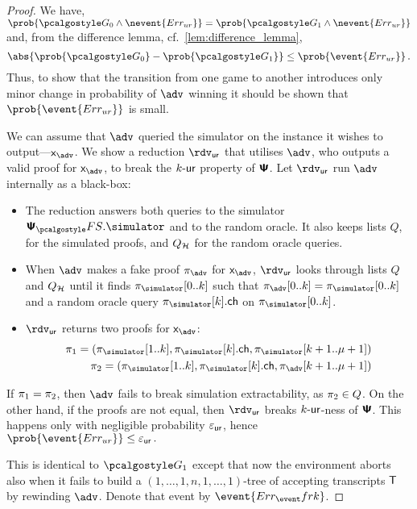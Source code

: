 \documentclass[runningheads,11pt]{llncs}
\begin{document}
\begin{proof}
   We have, \( \prob{\game{0} \land
    \nevent{\errur}} = \prob{\game{1} \land \nevent{\errur}} \) and, from the
  difference lemma, cf.~\cref{lem:difference_lemma},
  \[ \abs{\prob{\game{0}} - \prob{\game{1}}} \leq \prob{\event{\errur}}\,. \]
  Thus, to show that the transition from one game to another introduces only
  minor change in probability of $\advse$ winning it should be shown that
  $\prob{\event{\errur}}$ is small.

  We can assume that $\advse$ queried the simulator on the instance it wishes to
  output---$\inp_{\advse}$. We show a reduction $\rdvur$ that utilises $\advse$,
  who outputs a valid proof for $\inp_{\advse}$, to break the ${k\text{-}\mathsf{ur}}$ property of
  $\bm{\mathsf{\Psi}}$. Let $\rdvur$ run $\advse$ internally as a black-box:
\begin{itemize}
	\item The reduction answers both queries to the simulator $\psfs.\simulator$ and to the random oracle. 
	It also keeps lists $Q$, for the simulated proofs, and $Q_{\mathcal{H}}$ for the random oracle queries. 
\item When $\advse$ makes a fake proof $\zkproof_{\advse}$ for $\inp_{\advse}$,
  $\rdvur$ looks through lists $Q$ and $Q_{\mathcal{H}}$ until it finds
  $\zkproof_{\simulator}[0..k]$ such that
  $\zkproof_{\advse}[0..k] = \zkproof_{\simulator}[0..k]$
  and a random oracle query $\zkproof_{\simulator}[k].\ch$ on
  $\zkproof_{\simulator}[0..k]$.
	\item $\rdvur$ returns two proofs for $\inp_{\advse}$:
	\begin{align*}
		\zkproof_1 = (\zkproof_{\simulator}[1..k],
		\zkproof_{\simulator}[k].\ch, \zkproof_{\simulator}[k + 1..\mu + 1])\\
		\zkproof_2 = (\zkproof_{\simulator}[1..k],
		\zkproof_{\simulator}[k].\ch, \zkproof_{\advse}[k + 1..\mu + 1])
	\end{align*}
	\end{itemize}  
	If $\pi_1 = \pi_2$, then $\advse$ fails to break simulation
  extractability, as $\pi_2 \in Q$. On the other hand, if the proofs are
  not equal, then $\rdvur$ breaks ${k\text{-}\mathsf{ur}}$-ness of $\bm{\mathsf{\Psi}}$. This happens only with
  negligible probability $\varepsilon_{\mathsf{ur}}$, hence \( \prob{\event{\errur}} \leq
  \epsur\,. \)
	
   This is identical to $\game{1}$ except that now the environment
  aborts also when it fails to build a $(1, \ldots, 1, n, 1, \ldots, 1)$-tree
  of accepting transcripts $\mathsf{T}$ by rewinding $\advse$. Denote that event by
  $\event{\errfrk}$. 


\end{proof}
\end{document}
